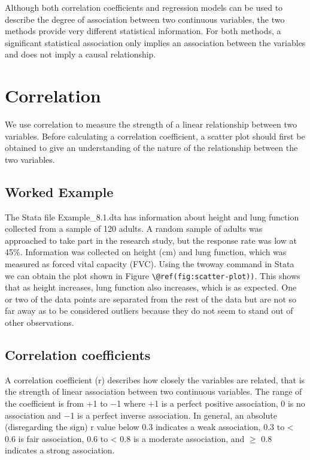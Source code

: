 \documentclass[
]{memoir}
\begin{document}
Although both correlation coefficients and regression models can be used to describe the degree of association between two continuous variables, the two methods provide very different statistical information. For both methods, a significant statistical association only implies an association between the variables and does not imply a causal relationship.

\hypertarget{correlation}{%
\section{Correlation}\label{correlation}}

We use correlation to measure the strength of a linear relationship between two variables. Before calculating a correlation coefficient, a scatter plot should first be obtained to give an understanding of the nature of the relationship between the two variables.

\hypertarget{worked-example-11}{%
\subsection{Worked Example}\label{worked-example-11}}

The Stata file Example\_8.1.dta has information about height and lung function collected from a sample of 120 adults. A random sample of adults was approached to take part in the research study, but the response rate was low at 45\%. Information was collected on height (cm) and lung function, which was measured as forced vital capacity (FVC). Using the twoway command in Stata we can obtain the plot shown in Figure \texttt{\textbackslash{}@ref(fig:scatter-plot))}. This shows that as height increases, lung function also increases, which is as expected. One or two of the data points are separated from the rest of the data but are not so far away as to be considered outliers because they do not seem to stand out of other observations.

\hypertarget{correlation-coefficients}{%
\subsection{Correlation coefficients}\label{correlation-coefficients}}

A correlation coefficient (r) describes how closely the variables are related, that is the strength of linear association between two continuous variables. The range of the coefficient is from +1 to −1 where +1 is a perfect positive association, 0 is no association and −1 is a perfect inverse association. In general, an absolute (disregarding the sign) r value below 0.3 indicates a weak association, 0.3 to \textless{} 0.6 is fair association, 0.6 to \textless{} 0.8 is a moderate association, and \(\ge\) 0.8 indicates a strong association.
\end{document}
